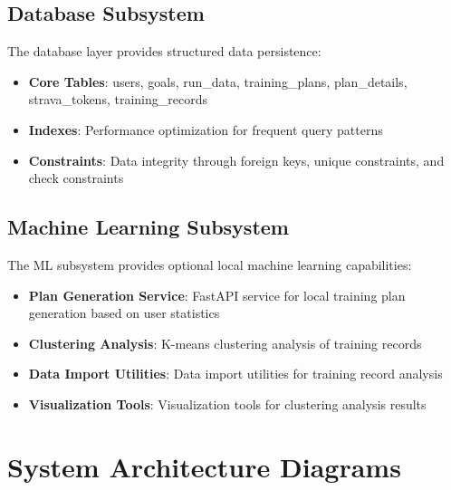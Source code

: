 \subsection{Database Subsystem}

The database layer provides structured data persistence:

\begin{itemize}
    \item \textbf{Core Tables}: users, goals, run\_data, training\_plans, plan\_details, strava\_tokens, training\_records
    \item \textbf{Indexes}: Performance optimization for frequent query patterns
    \item \textbf{Constraints}: Data integrity through foreign keys, unique constraints, and check constraints
\end{itemize}

\subsection{Machine Learning Subsystem}

The ML subsystem provides optional local machine learning capabilities:

\begin{itemize}
    \item \textbf{Plan Generation Service}: FastAPI service for local training plan generation based on user statistics
    \item \textbf{Clustering Analysis}: K-means clustering analysis of training records
    \item \textbf{Data Import Utilities}: Data import utilities for training record analysis
    \item \textbf{Visualization Tools}: Visualization tools for clustering analysis results
\end{itemize}

\section{System Architecture Diagrams}


